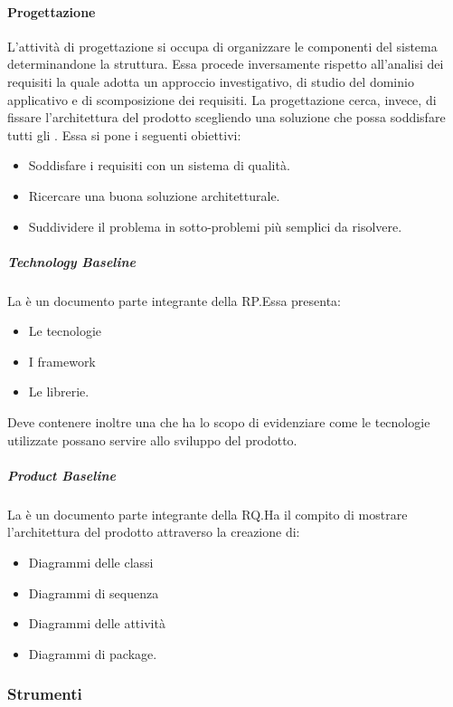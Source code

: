 \documentclass[../norme-di-progetto.tex]{subfiles}
\begin{document}
\paragraph{Progettazione}%
\label{par:progettazione}
L'attività di progettazione si occupa di organizzare le componenti del sistema determinandone la struttura. Essa procede inversamente rispetto all'analisi dei requisiti la quale adotta un approccio investigativo, di studio del dominio applicativo e di scomposizione dei requisiti. La progettazione cerca, invece, di fissare l'architettura del prodotto scegliendo una soluzione che possa soddisfare tutti gli .
Essa si pone i seguenti obiettivi:
\begin{itemize}
  \item Soddisfare i requisiti con un sistema di qualità.
  \item Ricercare una buona soluzione architetturale.
  \item Suddividere il problema in sotto-problemi più semplici da risolvere.
\end{itemize}

\subparagraph{Technology Baseline}%
\label{subp:technology_baseline}
La  è un documento parte integrante della RP.\@ Essa presenta:

\begin{itemize}
  \item Le tecnologie
  \item I framework
  \item Le librerie.
\end{itemize}
Deve contenere inoltre una  che ha lo scopo di evidenziare come le tecnologie utilizzate possano servire allo sviluppo del prodotto.

\subparagraph{Product Baseline}%
\label{subp:product_baseline}
La  è un documento parte integrante della RQ.\@ Ha il compito di mostrare l'architettura del prodotto attraverso la creazione di:

\begin{itemize}
  \item Diagrammi delle classi
  \item Diagrammi di sequenza
  \item Diagrammi delle attività
  \item Diagrammi di package.
\end{itemize}

\subsubsection{Strumenti}%
\label{subs:strumenti}
\end{document}
